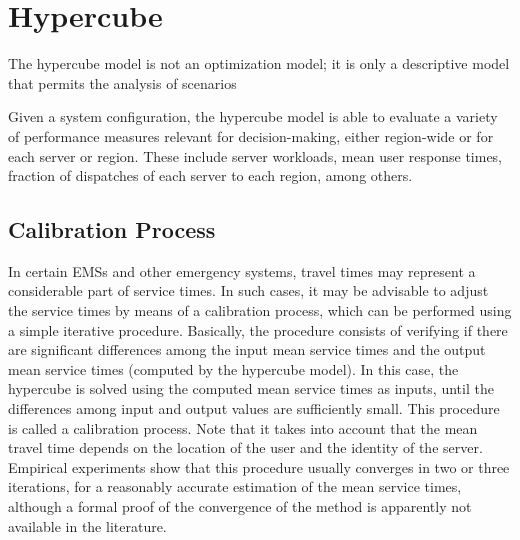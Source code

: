 \section{Hypercube}
The hypercube model
is not an optimization model; 
it is only a descriptive model
that permits the analysis of scenarios

Given a system configuration,
the hypercube model
is able to evaluate
a variety of performance measures relevant for decision-making,
either region-wide or for each server or region. 
These include
server workloads,
mean user response times,
fraction of dispatches of each server to each region,
among others.

\subsection{Calibration Process}
In certain EMSs
and other emergency systems,
travel times may represent
a considerable part of service times.
In such cases,
it may be advisable
to adjust the service times
by means of a calibration process,
which can be performed
using a simple iterative procedure.
Basically,
the procedure consists of
verifying
if there are
significant differences among the input mean service times
and the output mean service times (computed by the hypercube model).
In this case,
the hypercube is solved
using the computed mean service times as inputs,
until
the differences
among input and output values
are sufficiently small.
This procedure is called
a calibration process.
Note that
it takes into account
that the mean travel time
depends on the location of the user
and the identity of the server.
Empirical experiments show
that this procedure
usually converges in two or three iterations,
for a reasonably accurate estimation of the mean service times,
although a formal proof of the convergence of the method
is apparently not available in the literature.
